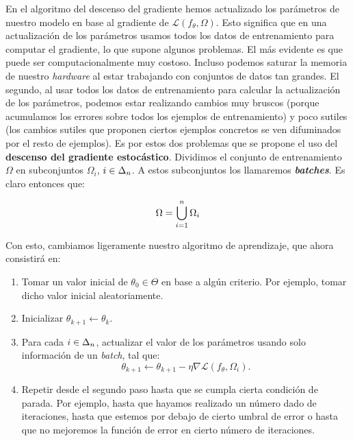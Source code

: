 En el algoritmo del descenso del gradiente hemos actualizado los parámetros de nuestro modelo en base al gradiente de $\mathcal{L}(f_{\theta}, \Omega)$. Esto significa que en una actualización de los parámetros usamos todos los datos de entrenamiento para computar el gradiente, lo que supone algunos problemas. El más evidente es que puede ser computacionalmente muy costoso. Incluso podemos saturar la memoria de nuestro \textit{hardware} al estar trabajando con conjuntos de datos tan grandes. El segundo, al usar todos los datos de entrenamiento para calcular la actualización de los parámetros, podemos estar realizando cambios muy bruscos (porque acumulamos los errores sobre todos los ejemplos de entrenamiento) y poco sutiles (los cambios sutiles que proponen ciertos ejemplos concretos se ven difuminados por el resto de ejemplos). Es por estos dos problemas que se propone el uso del \textbf{descenso del gradiente estocástico}. Dividimos el conjunto de entrenamiento $\Omega$ en subconjuntos $\Omega_i$, $i \in \Delta_{n}$. A estos subconjuntos los llamaremos \textbf{\textit{batches}}. Es claro entonces que:

\begin{equation}
    \Omega = \bigcup_{i = 1}^n \Omega_i
\end{equation}

Con esto, cambiamos ligeramente nuestro algoritmo de aprendizaje, que ahora consistirá en:

\begin{enumerate}
    \item Tomar un valor inicial de $\theta_0 \in \Theta$ en base a algún criterio. Por ejemplo, tomar dicho valor inicial aleatoriamente.
    \item Inicializar $\theta_{k + 1} \leftarrow \theta_k$.
    \item Para cada $i \in \Delta_{n}$, actualizar el valor de los parámetros usando solo información de un \textit{batch}, tal que:
        \begin{equation}
            \theta_{k + 1} \leftarrow \theta_{k + 1} - \eta \nabla \mathcal{L}(f_\theta, \Omega_i).
        \end{equation}
    \item Repetir desde el segundo paso hasta que se cumpla cierta condición de parada. Por ejemplo, hasta que hayamos realizado un número dado de iteraciones, hasta que estemos por debajo de cierto umbral de error o hasta que no mejoremos la función de error en cierto número de iteraciones.
\end{enumerate}


